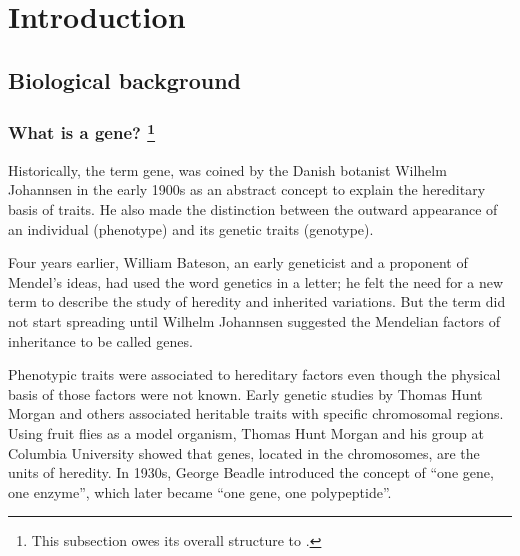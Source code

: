 \clearemptydoublepage


\pagestyle{fancy}
\renewcommand{\sectionmark}[1]{\markboth{}{\thesection.\ #1}}
\renewcommand{\subsectionmark}[1]{\markboth{}{\thesubsection.\ \textsl{#1}}}

{\setlength{\parskip}{0.4ex plus0.2ex minus0.2ex} %

\tableofcontents}

\vfill



\clearemptydoublepage

\newpage
{}
\setcounter{page}{1}

\chapter{Introduction}

\section{Biological background}

\subsection[What is a gene?]{What is a gene? 
\footnote{This subsection owes its overall structure to \cite{snyder:2003a}.}}

Historically, the term gene, was coined by the Danish botanist Wilhelm
Johannsen in the early 1900s as an abstract concept to explain the
hereditary basis of traits. He also made the distinction between the
outward appearance of an individual (phenotype) and its genetic traits
(genotype).

Four years earlier, William Bateson, an early geneticist and a
proponent of Mendel's ideas, had used the word genetics in a letter;
he felt the need for a new term to describe the study of heredity and
inherited variations. But the term did not start spreading until
Wilhelm Johannsen suggested the Mendelian factors of inheritance
to be called genes.

Phenotypic traits were associated to hereditary factors even though the
physical basis of those factors were not known. Early genetic studies
by Thomas Hunt Morgan and others associated heritable traits with
specific chromosomal regions. Using fruit flies as a model organism,
Thomas Hunt Morgan and his group at Columbia University showed that
genes, located in the chromosomes, are the units of heredity.  In 1930s,
George Beadle introduced the concept of ``one gene, one enzyme'',
which later became ``one gene, one polypeptide''.

